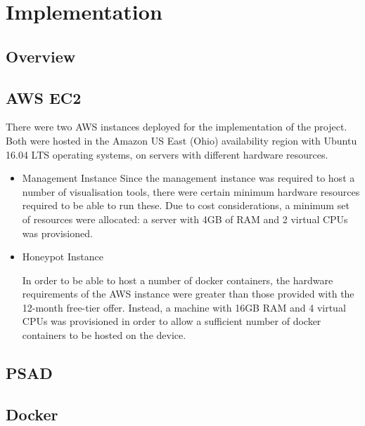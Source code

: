 \chapter{Implementation}



\section{Overview}



\section{AWS EC2}
There were two AWS instances deployed for the implementation of the project. Both were hosted in the Amazon US East (Ohio) availability region with Ubuntu 16.04 LTS operating systems, on servers with different hardware resources.

\begin{itemize}
	
	\item Management Instance
	Since the management instance was required to host a number of visualisation tools, there were certain minimum hardware resources required to be able to run these. Due to cost considerations, a minimum set of resources were allocated: a server with 4GB of RAM and 2 virtual CPUs was provisioned. 
	
	\item Honeypot Instance
	
	In order to be able to host a number of docker containers, the hardware requirements of the AWS instance were greater than those provided with the 12-month free-tier offer. Instead, a machine with 16GB RAM and 4 virtual CPUs was provisioned in order to allow a sufficient number of docker containers to be hosted on the device. 
	
	
\end{itemize}




\section{PSAD}

\section{Docker}

